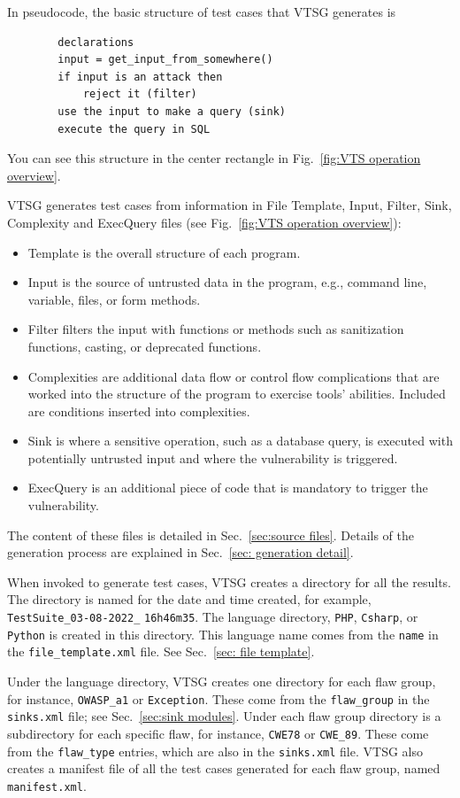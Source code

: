 In pseudocode, the basic structure of test cases that VTSG generates is
\begin{verbatim}
        declarations
        input = get_input_from_somewhere()
        if input is an attack then
            reject it (filter)
        use the input to make a query (sink)
        execute the query in SQL
\end{verbatim}
You can see this structure in the center rectangle in
Fig.~\ref{fig:VTS operation overview}.

VTSG generates test cases from information in File Template, Input,
Filter, Sink, Complexity and ExecQuery files 
(see Fig.~\ref{fig:VTS operation overview}):
\begin{itemize}
 \item Template is the overall structure of each program.
 \item Input is the source of untrusted data in the program, e.g., 
 command line, variable, files, or form methods.
 \item Filter filters the input with functions or methods such as sanitization
   functions, casting, or deprecated functions.
 \item Complexities are additional data flow or control flow complications that are
   worked into the structure of the program to exercise tools' abilities.
   Included are conditions inserted into complexities.
 \item Sink is where a sensitive operation, such as a database query, 
 is executed with potentially untrusted input and where the 
 vulnerability is triggered.
 \item ExecQuery is an additional piece of code that is mandatory to 
 trigger the vulnerability.
\end{itemize}
The content of these files is detailed in
Sec.~\ref{sec:source files}.
Details of the generation process are explained in
Sec.~\ref{sec: generation detail}.

\label{sec:case directory structure}
When invoked to generate test cases, VTSG creates a directory for all the results.
The directory is named for the date and time created, for example,
\verb|TestSuite_03-08-2022_| \verb|16h46m35|.
The language directory, \verb|PHP|,
\verb|Csharp|, or \verb|Python| is created in this directory.
This language name comes from the \verb|name|
in the \verb|file_template.xml| file.  See Sec.~\ref{sec: file template}.

Under the language directory, VTSG creates one directory for each flaw group, for
instance, \verb|OWASP_a1| or \verb|Exception|.  These come from the \verb|flaw_group|
in the \verb|sinks.xml| file; see Sec.~\ref{sec:sink modules}.
Under each flaw group directory is a subdirectory for each specific flaw, for
instance, \verb|CWE78| or \verb|CWE_89|.  These come from the \verb|flaw_type|
entries, which are also in the \verb|sinks.xml| file.
VTSG also creates a manifest file of all the test cases generated for each flaw
group, named
\verb|manifest.xml|.

